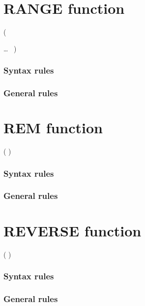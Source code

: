 \section{RANGE function}

\begin{syntax}
    (
  \begin{1=}
    \argument
  \end{1=}\ldots
  \ {})
\end{syntax}

\subsubsection{Syntax rules}

\subsubsection{General rules}

\section{REM function}

\begin{syntax}
    ( \argument \argument )
\end{syntax}

\subsubsection{Syntax rules}

\subsubsection{General rules}

\section{REVERSE function}

\begin{syntax}
    ( \argument )
\end{syntax}

\subsubsection{Syntax rules}

\subsubsection{General rules}

